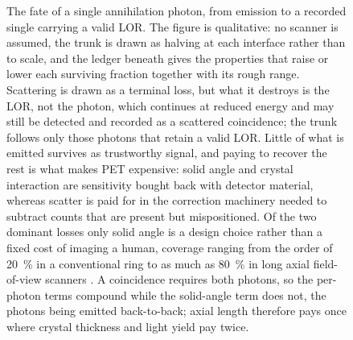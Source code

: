 \begin{figure}[p]
	\centering
	
	\caption[What governs the fate of an annihilation photon]{%
		The fate of a single  annihilation photon, from emission to a recorded single carrying a valid LOR.
		The figure is qualitative: no scanner is assumed, the trunk is drawn as halving at each interface rather than to scale, and the ledger beneath gives the properties that raise or lower each surviving fraction together with its rough range.
		Scattering is drawn as a terminal loss, but what it destroys is the LOR, not the photon, which continues at reduced energy and may still be detected and recorded as a scattered coincidence; the trunk follows only those photons that retain a valid LOR.
		Little of what is emitted survives as trustworthy signal, and paying to recover the rest is what makes PET expensive: solid angle and crystal interaction are sensitivity bought back with detector material, whereas scatter is paid for in the correction machinery needed to subtract counts that are present but mispositioned.
		Of the two dominant losses only solid angle is a design choice rather than a fixed cost of imaging a human, coverage ranging from the order of \qty{20}{\percent} in a conventional ring to as much as \qty{80}{\percent} in long axial field-of-view scanners \cite{Vandenberghe2020}.
		A coincidence requires both photons, so the per-photon terms compound while the solid-angle term does not, the photons being emitted back-to-back; axial length therefore pays once where crystal thickness and light yield pay twice.}
	\label{fig:photon-flow}
\end{figure}
